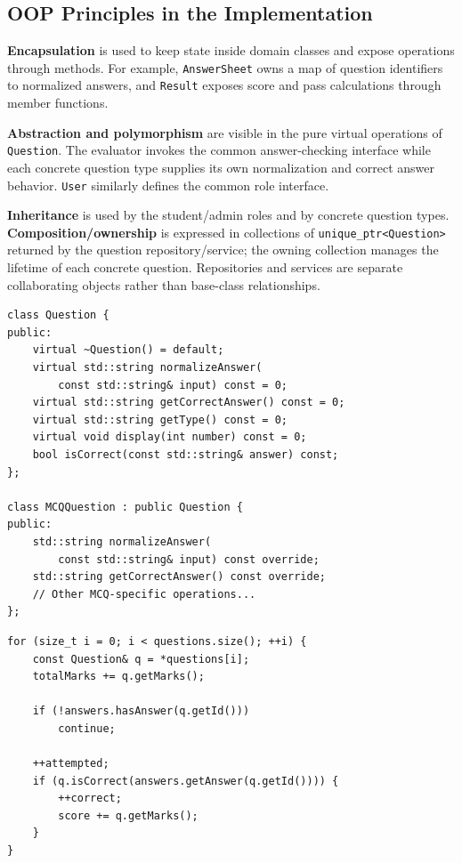 \documentclass[12pt,a4paper,oneside]{book}
\begin{document}
\subsection{OOP Principles in the Implementation}
\textbf{Encapsulation} is used to keep state inside domain classes and expose operations through methods. For example, \texttt{AnswerSheet} owns a map of question identifiers to normalized answers, and \texttt{Result} exposes score and pass calculations through member functions.

\textbf{Abstraction and polymorphism} are visible in the pure virtual operations of \texttt{Question}. The evaluator invokes the common answer-checking interface while each concrete question type supplies its own normalization and correct answer behavior. \texttt{User} similarly defines the common role interface.

\textbf{Inheritance} is used by the student/admin roles and by concrete question types. \textbf{Composition/ownership} is expressed in collections of \texttt{unique\_ptr<Question>} returned by the question repository/service; the owning collection manages the lifetime of each concrete question. Repositories and services are separate collaborating objects rather than base-class relationships.

\begin{lstlisting}[caption={Abstract question interface and runtime-polymorphic question types (excerpt from include/models/Question.h).},label={lst:question}]
class Question {
public:
    virtual ~Question() = default;
    virtual std::string normalizeAnswer(
        const std::string& input) const = 0;
    virtual std::string getCorrectAnswer() const = 0;
    virtual std::string getType() const = 0;
    virtual void display(int number) const = 0;
    bool isCorrect(const std::string& answer) const;
};

class MCQQuestion : public Question {
public:
    std::string normalizeAnswer(
        const std::string& input) const override;
    std::string getCorrectAnswer() const override;
    // Other MCQ-specific operations...
};
\end{lstlisting}

\begin{lstlisting}[caption={Evaluation accumulates marks through the base-class interface (excerpt from src/services/EvaluationService.cpp).},label={lst:evaluation}]
for (size_t i = 0; i < questions.size(); ++i) {
    const Question& q = *questions[i];
    totalMarks += q.getMarks();

    if (!answers.hasAnswer(q.getId()))
        continue;

    ++attempted;
    if (q.isCorrect(answers.getAnswer(q.getId()))) {
        ++correct;
        score += q.getMarks();
    }
}
\end{lstlisting}
\end{document}

